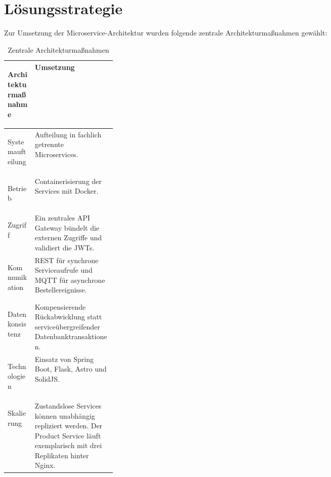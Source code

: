 \section{Lösungsstrategie}

Zur Umsetzung der Microservice-Architektur wurden folgende zentrale
Architekturmaßnahmen gewählt:

\begin{table}[htbp]
    \centering

    {
        \renewcommand{\arraystretch}{1.5}

        \begin{tabularx}{\linewidth}{
                >{\bfseries\raggedright\arraybackslash}p{0.25\linewidth}
                >{\raggedright\arraybackslash}X
        }
            \toprule
            Architekturmaßnahme & Umsetzung \\
            \midrule

            Systemaufteilung &
            Aufteilung in fachlich getrennte Microservices. \\

            Betrieb &
            Containerisierung der Services mit Docker. \\

            Zugriff &
            Ein zentrales API Gateway bündelt die externen Zugriffe und
            validiert die JWTs. \\

            Kommunikation &
            REST für synchrone Serviceaufrufe und MQTT für asynchrone
            Bestellereignisse. \\

            Datenkonsistenz &
            Kompensierende Rückabwicklung statt serviceübergreifender
            Datenbanktransaktionen. \\

            Technologien &
            Einsatz von Spring Boot, Flask, Astro und SolidJS. \\

            Skalierung &
            Zustandslose Services können unabhängig repliziert werden.
            Der Product Service läuft exemplarisch mit drei Replikaten hinter Nginx. \\

            \bottomrule
        \end{tabularx}
    }

    \caption{Zentrale Architekturmaßnahmen}
    \label{tab:loesungsstrategie}
\end{table}
